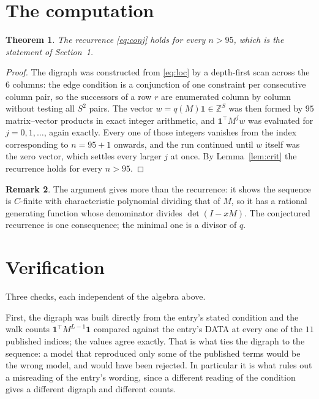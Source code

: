 \documentclass[11pt,a4paper]{article}
\theoremstyle{plain}
\newtheorem{theorem}{Theorem}
\theoremstyle{definition}
\newtheorem{remark}[theorem]{Remark}
\begin{document}
\section{The computation}

\begin{theorem}
The recurrence \eqref{eq:conj} holds for every $n>95$, which is the statement of
Section~1.
\end{theorem}

\begin{proof}
The digraph was constructed from \eqref{eq:loc} by a depth-first scan across the $6$
columns: the edge condition is a conjunction of one constraint per consecutive column
pair, so the successors of a row $r$ are enumerated column by column without testing all
$S^2$ pairs. The vector $w=q(M)\mathbf{1}\in\mathbb{Z}^{S}$ was then formed by $95$
matrix--vector products in exact integer arithmetic, and $\mathbf{1}^{\!\top}M^{j}w$ was
evaluated for $j=0,1,\dots$, again exactly. Every one of those integers vanishes from the
index corresponding to $n=95+1$ onwards, and the run continued until $w$ itself was the
zero vector, which settles every larger $j$ at once. By Lemma~\ref{lem:crit} the recurrence
holds for every $n>95$.
\end{proof}

\begin{remark}
The argument gives more than the recurrence: it shows the sequence is $C$-finite with
characteristic polynomial dividing that of $M$, so it has a rational generating function
whose denominator divides $\det(I-xM)$. The conjectured recurrence is one consequence; the
minimal one is a divisor of $q$.
\end{remark}

\section{Verification}

Three checks, each independent of the algebra above.

First, the digraph was built directly from the entry's stated condition and the walk counts
$\mathbf{1}^{\!\top}M^{L-1}\mathbf{1}$ compared against the entry's DATA at
every one of the $11$ published indices; the values agree exactly. That is what ties
the digraph to the sequence: a model that reproduced only some of the published terms would
be the wrong model, and would have been rejected. In particular it is what rules out a
misreading of the entry's wording, since a different reading of the condition gives a
different digraph and different counts.
\end{document}
